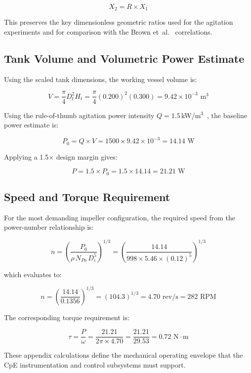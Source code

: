 \begin{equation}
X_2 = R \times X_1
\label{eq:scaling_general}
\end{equation}

This preserves the key dimensionless geometric ratios used for the agitation experiments and for comparison with the Brown et~al.~\cite{brown1950} correlations.

\subsection{Tank Volume and Volumetric Power Estimate}

Using the scaled tank dimensions, the working vessel volume is:

\begin{equation}
V = \frac{\pi}{4} D_t^2 H_t = \frac{\pi}{4} (0.200)^2 (0.300) = 9.42 \times 10^{-3} \text{ m}^3
\label{eq:tank_volume}
\end{equation}

Using the rule-of-thumb agitation power intensity $Q = 1.5$\,kW/m$^3$~\cite{harnby2000}, the baseline power estimate is:

\begin{equation}
P_0 = Q \times V = 1500 \times 9.42 \times 10^{-3} = 14.14 \text{ W}
\label{eq:power_volumetric}
\end{equation}

Applying a 1.5$\times$ design margin gives:

\begin{equation}
P = 1.5 \times P_0 = 1.5 \times 14.14 = 21.21 \text{ W}
\label{eq:power_with_margin}
\end{equation}

\subsection{Speed and Torque Requirement}

For the most demanding impeller configuration, the required speed from the power-number relationship is:

\begin{equation}
n = \left( \frac{P_0}{\rho \, N_{Po} \, D_i^5} \right)^{1/3} = \left( \frac{14.14}{998 \times 5.46 \times (0.12)^5} \right)^{1/3}
\label{eq:speed_calc}
\end{equation}

which evaluates to:

\begin{equation}
n = \left( \frac{14.14}{0.1356} \right)^{1/3} = (104.3)^{1/3} = 4.70 \text{ rev/s} = 282 \text{ RPM}
\label{eq:speed_result}
\end{equation}

The corresponding torque requirement is:

\begin{equation}
\tau = \frac{P}{\omega} = \frac{21.21}{2\pi \times 4.70} = \frac{21.21}{29.53} = 0.72 \text{ N}\cdot\text{m}
\label{eq:torque}
\end{equation}

These appendix calculations define the mechanical operating envelope that the CpE instrumentation and control subsystems must support.